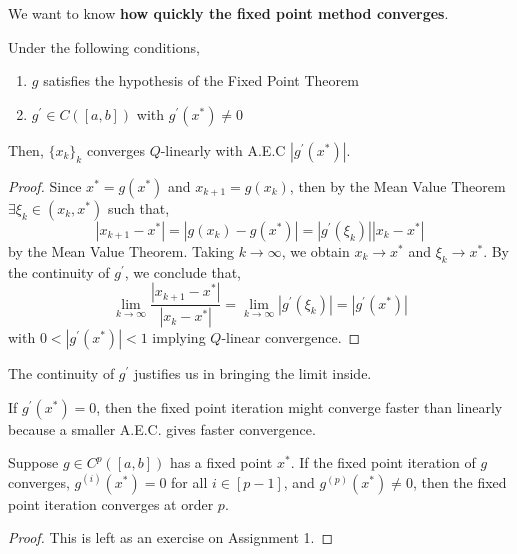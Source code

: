 \noindent We want to know \textbf{how quickly the fixed point method converges}. 

\begin{thm}
    Under the following conditions,
    \begin{enumerate}
        \item $g$ satisfies the hypothesis of the Fixed Point Theorem
        \item $g^{\prime} \in C([a, b])$ with $g^{\prime}(x^*) \neq 0$
    \end{enumerate}
    Then, $\{x_k\}_k$ converges $Q$-linearly with A.E.C $ |g^{\prime}(x^*)|$.
\end{thm}

\begin{proof}
    Since $x^{*} = g(x^{*})$ and $x_{k+1} = g(x_k)$, then by the Mean Value Theorem $\exists \xi_k \in (x_k, x^*)$ such that,
    \[\left|x_{k+1}-x^*\right|=\left|g\left(x_k\right)-g\left(x^*\right)\right|=\left|g^{\prime}\left(\xi_k\right)\right|\left|x_k-x^*\right|\]
    by the Mean Value Theorem. Taking $k \rightarrow \infty$, we obtain $x_k \rightarrow x^*$ and $\xi_k \rightarrow x^*$. By the continuity of $g^{\prime}$, we conclude that,
    \[\lim _{k \rightarrow \infty} \frac{\left|x_{k+1}-x^*\right|}{\left|x_k-x^*\right|}=\lim _{k \rightarrow \infty}\left|g^{\prime}\left(\xi_k\right)\right|=\left|g^{\prime}\left(x^*\right)\right|\]
    with  $0 < \left|g^{\prime}\left(x^*\right)\right| < 1$ implying $Q$-linear convergence.
\end{proof}

\begin{marginfigure}
    The continuity of $g^{\prime}$ justifies us in bringing the limit inside.
\end{marginfigure}

\begin{rmk}
    If $g^{\prime}(x^*) = 0$, then the fixed point iteration might converge faster than linearly because a smaller A.E.C. gives faster convergence.
\end{rmk}

\begin{thm}
   Suppose $g \in C^p([a, b])$ has a fixed point $x^*$. If the fixed point iteration of $g$ converges,  $g^{(i)}\left(x^*\right)=0$ for all $i \in [p-1]$, and $g^{(p)}\left(x^*\right) \neq 0$, then the fixed point iteration converges at order $p$.
\end{thm}

\begin{proof}
   This is left as an exercise on Assignment 1.
\end{proof}

